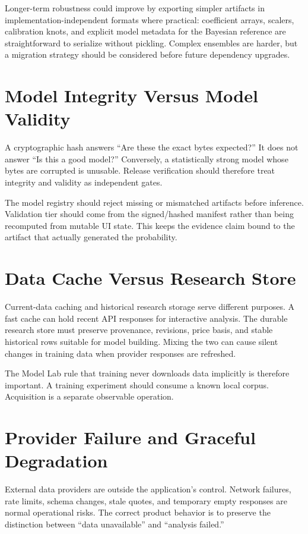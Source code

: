 \documentclass[11pt]{article}
\begin{document}
Longer-term robustness could improve by exporting simpler artifacts in implementation-independent formats where practical: coefficient arrays, scalers, calibration knots, and explicit model metadata for the Bayesian reference are straightforward to serialize without pickling. Complex ensembles are harder, but a migration strategy should be considered before future dependency upgrades.

\section{Model Integrity Versus Model Validity}
A cryptographic hash answers ``Are these the exact bytes expected?'' It does not answer ``Is this a good model?'' Conversely, a statistically strong model whose bytes are corrupted is unusable. Release verification should therefore treat integrity and validity as independent gates.

The model registry should reject missing or mismatched artifacts before inference. Validation tier should come from the signed/hashed manifest rather than being recomputed from mutable UI state. This keeps the evidence claim bound to the artifact that actually generated the probability.

\section{Data Cache Versus Research Store}
Current-data caching and historical research storage serve different purposes. A fast cache can hold recent API responses for interactive analysis. The durable research store must preserve provenance, revisions, price basis, and stable historical rows suitable for model building. Mixing the two can cause silent changes in training data when provider responses are refreshed.

The Model Lab rule that training never downloads data implicitly is therefore important. A training experiment should consume a known local corpus. Acquisition is a separate observable operation.

\section{Provider Failure and Graceful Degradation}
External data providers are outside the application's control. Network failures, rate limits, schema changes, stale quotes, and temporary empty responses are normal operational risks. The correct product behavior is to preserve the distinction between ``data unavailable'' and ``analysis failed.''
\end{document}
